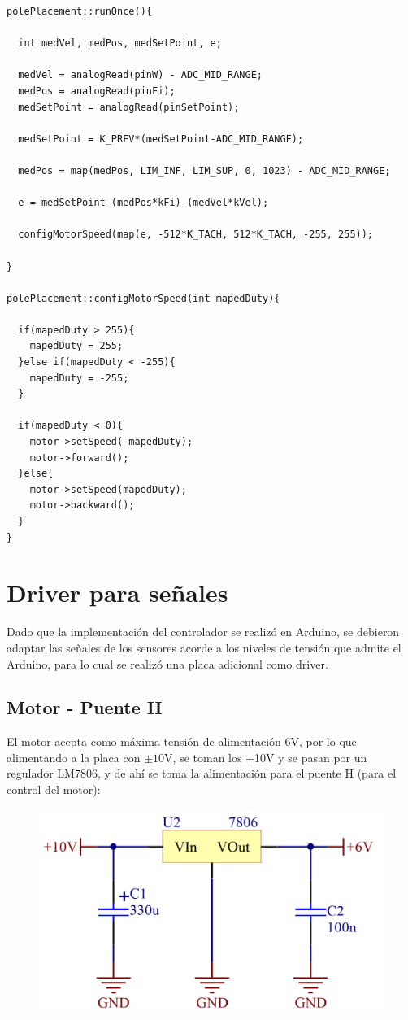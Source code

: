 \documentclass{article}
\begin{document}
\begin{lstlisting}
polePlacement::runOnce(){

  int medVel, medPos, medSetPoint, e;

  medVel = analogRead(pinW) - ADC_MID_RANGE;
  medPos = analogRead(pinFi);
  medSetPoint = analogRead(pinSetPoint);

  medSetPoint = K_PREV*(medSetPoint-ADC_MID_RANGE);

  medPos = map(medPos, LIM_INF, LIM_SUP, 0, 1023) - ADC_MID_RANGE;
  
  e = medSetPoint-(medPos*kFi)-(medVel*kVel);

  configMotorSpeed(map(e, -512*K_TACH, 512*K_TACH, -255, 255));
  
}

polePlacement::configMotorSpeed(int mapedDuty){
  
  if(mapedDuty > 255){
    mapedDuty = 255;
  }else if(mapedDuty < -255){
    mapedDuty = -255;
  }

  if(mapedDuty < 0){
    motor->setSpeed(-mapedDuty);
    motor->forward();   
  }else{
    motor->setSpeed(mapedDuty);
    motor->backward();    
  }
}

\end{lstlisting}

\newpage

\section{Driver para señales}
Dado que la implementación del controlador se realizó en Arduino, se debieron adaptar las señales de los sensores acorde a los niveles de tensión que admite el Arduino, para lo cual se realizó una placa adicional como driver.

\subsection{Motor - Puente H}
El motor acepta como máxima tensión de alimentación 6V, por lo que alimentando a la placa con $\pm 10$V, se toman los +10V y se pasan por un regulador LM7806, y de ahí se toma la alimentación para el puente H (para el control del motor):

\begin{figure}[H]
\centering
\includegraphics[width=0.4\linewidth]{../Images/Regulador.png}
\end{figure}
\end{document}

